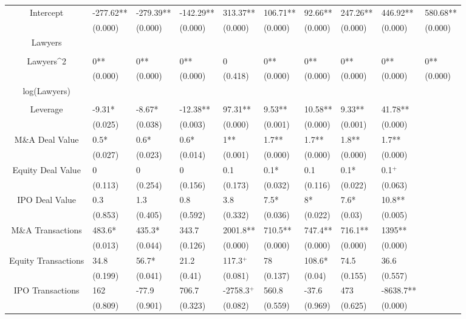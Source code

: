 \documentclass{article}
\begin{document}
\begin{table}[H]
\begin{tabular}{|clllllllll|}
Intercept & -277.62** & -279.39** & -142.29** & 313.37** & 106.71** & 92.66** & 247.26** & 446.92** & 580.68** \\ 
   & (0.000) & (0.000) & (0.000) & (0.000) & (0.000) & (0.000) & (0.000) & (0.000) & (0.000) \\ 
  Lawyers &  &  &  &  &  &  &  &  &  \\ 
   &  &  &  &  &  &  &  &  &  \\ 
  Lawyers^2 & 0** & 0** & 0** & 0 & 0** & 0** & 0** & 0** & 0** \\ 
   & (0.000) & (0.000) & (0.000) & (0.418) & (0.000) & (0.000) & (0.000) & (0.000) & (0.000) \\ 
  log(Lawyers) &  &  &  &  &  &  &  &  &  \\ 
   &  &  &  &  &  &  &  &  &  \\ 
  Leverage & -9.31* & -8.67* & -12.38** & 97.31** & 9.53** & 10.58** & 9.33** & 41.78** &  \\ 
   & (0.025) & (0.038) & (0.003) & (0.000) & (0.001) & (0.000) & (0.001) & (0.000) &  \\ 
  M\&A Deal Value & 0.5* & 0.6* & 0.6* & 1** & 1.7** & 1.7** & 1.8** & 1.7** &  \\ 
   & (0.027) & (0.023) & (0.014) & (0.001) & (0.000) & (0.000) & (0.000) & (0.000) &  \\ 
  Equity Deal Value & 0 & 0 & 0 & 0.1 & 0.1* & 0.1 & 0.1* & 0.1$^{+}$ &  \\ 
   & (0.113) & (0.254) & (0.156) & (0.173) & (0.032) & (0.116) & (0.022) & (0.063) &  \\ 
  IPO Deal Value & 0.3 & 1.3 & 0.8 & 3.8 & 7.5* & 8* & 7.6* & 10.8** &  \\ 
   & (0.853) & (0.405) & (0.592) & (0.332) & (0.036) & (0.022) & (0.03) & (0.005) &  \\ 
  M\&A Transactions & 483.6* & 435.3* & 343.7 & 2001.8** & 710.5** & 747.4** & 716.1** & 1395** &  \\ 
   & (0.013) & (0.044) & (0.126) & (0.000) & (0.000) & (0.000) & (0.000) & (0.000) &  \\ 
  Equity Transactions & 34.8 & 56.7* & 21.2 & 117.3$^{+}$ & 78 & 108.6* & 74.5 & 36.6 &  \\ 
   & (0.199) & (0.041) & (0.41) & (0.081) & (0.137) & (0.04) & (0.155) & (0.557) &  \\ 
  IPO Transactions & 162 & -77.9 & 706.7 & -2758.3$^{+}$ & 560.8 & -37.6 & 473 & -8638.7** &  \\ 
   & (0.809) & (0.901) & (0.323) & (0.082) & (0.559) & (0.969) & (0.625) & (0.000) &  \\ 

\end{tabular}
\end{table}
\end{document}

